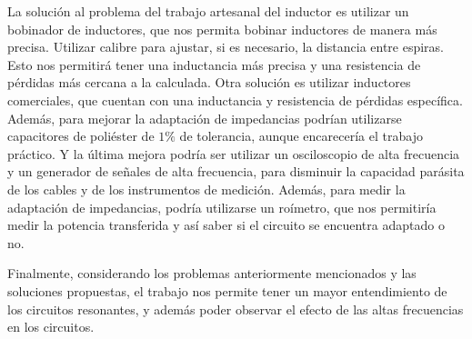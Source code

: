 La solución al problema del trabajo artesanal del inductor es utilizar un bobinador de inductores, que nos permita bobinar inductores de manera más precisa. Utilizar calibre 
para ajustar, si es necesario, la distancia entre espiras. Esto nos permitirá tener una inductancia más precisa y una resistencia de pérdidas más cercana a la calculada.
Otra solución es utilizar inductores comerciales, que cuentan con una inductancia y resistencia de pérdidas específica. Además, para mejorar la adaptación de impedancias
podrían utilizarse capacitores de poliéster de $1\%$ de tolerancia, aunque encarecería el trabajo práctico. Y la última mejora podría ser utilizar un osciloscopio 
de alta frecuencia y un generador de señales de alta frecuencia, para disminuir la capacidad parásita de los cables y de los instrumentos de medición. Además, para medir 
la adaptación de impedancias, podría utilizarse un roímetro, que nos permitiría medir la potencia transferida y así saber si el circuito se encuentra adaptado o no.



Finalmente, considerando los problemas anteriormente mencionados y las soluciones propuestas, el trabajo nos permite tener un mayor entendimiento de los circuitos resonantes,
y además poder observar el efecto de las altas frecuencias en los circuitos.